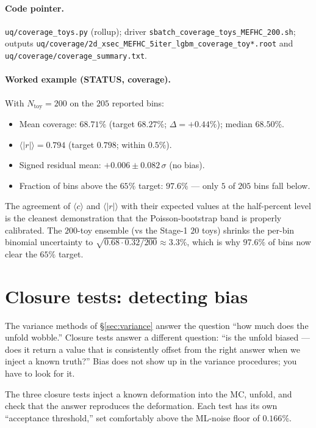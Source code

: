 \documentclass[12pt]{article}
\begin{document}
\paragraph{Code pointer.}
\texttt{uq/coverage\_toys.py} (rollup); driver
\texttt{sbatch\_coverage\_toys\_MEFHC\_200.sh}; outputs
\texttt{uq/coverage/2d\_xsec\_MEFHC\_5iter\_lgbm\_coverage\_toy*.root}
and \texttt{uq/coverage/coverage\_summary.txt}.

\paragraph{Worked example (STATUS, coverage).}
With $N_{\text{toy}}=200$ on the $205$ reported bins:
\begin{itemize}[nosep]
  \item Mean coverage: $\boxed{68.71\%}$ (target $68.27\%$;
        $\Delta = +0.44\%$); median $68.50\%$.
  \item $\langle |r| \rangle = 0.794$ (target $0.798$; within $0.5\%$).
  \item Signed residual mean: $+0.006 \pm 0.082\,\sigma$ (no bias).
  \item Fraction of bins above the $65\%$ target: $\boxed{97.6\%}$ ---
        only $5$ of $205$ bins fall below.
\end{itemize}
The agreement of $\langle c \rangle$ and $\langle |r| \rangle$ with
their expected values at the half-percent level is the cleanest
demonstration that the Poisson-bootstrap band is properly calibrated.
The $200$-toy ensemble (vs the Stage-1 $20$ toys) shrinks the per-bin
binomial uncertainty to $\sqrt{0.68\cdot0.32/200}\approx 3.3\%$, which
is why $97.6\%$ of bins now clear the $65\%$ target.

\section{Closure tests: detecting bias}
\label{sec:closure}

The variance methods of \S\ref{sec:variance} answer the question
``how much does the unfold wobble.'' Closure tests answer a
different question: ``is the unfold biased --- does it return a value
that is consistently offset from the right answer when we inject a
known truth?'' Bias does not show up in the variance procedures; you
have to look for it.

The three closure tests inject a known deformation into the MC,
unfold, and check that the answer reproduces the deformation. Each
test has its own ``acceptance threshold,'' set comfortably above the
ML-noise floor of $0.166\%$.
\end{document}
